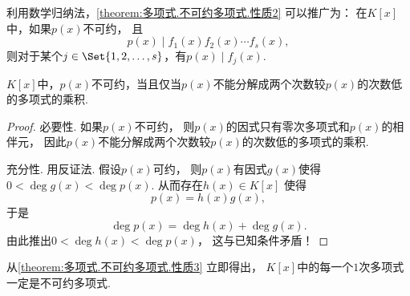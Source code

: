 利用数学归纳法，\cref{theorem:多项式.不可约多项式.性质2} 可以推广为：
在\(K[x]\)中，如果\(p(x)\)不可约，
且\begin{equation*}
	p(x) \mid f_1(x) f_2(x) \dotsm f_s(x),
\end{equation*}
则对于某个\(j \in \Set{1,2,\dotsc,s}\)，有\(p(x) \mid f_j(x)\).

\begin{property}\label{theorem:多项式.不可约多项式.性质3}
\(K[x]\)中，\(p(x)\)不可约，当且仅当\(p(x)\)不能分解成两个次数较\(p(x)\)的次数低的多项式的乘积.
\begin{proof}
必要性.
如果\(p(x)\)不可约，
则\(p(x)\)的因式只有零次多项式和\(p(x)\)的相伴元，
因此\(p(x)\)不能分解成两个次数较\(p(x)\)的次数低的多项式的乘积.

充分性.
用反证法.
假设\(p(x)\)可约，
则\(p(x)\)有因式\(g(x)\)使得\(0<\deg g(x)<\deg p(x)\).
从而存在\(h(x) \in K[x]\)
使得\begin{equation*}
	p(x) = h(x) g(x),
\end{equation*}
于是\begin{equation*}
	\deg p(x) = \deg h(x) + \deg g(x).
\end{equation*}
由此推出\(0<\deg h(x)<\deg p(x)\)，
这与已知条件矛盾！
\end{proof}
\end{property}

从\cref{theorem:多项式.不可约多项式.性质3} 立即得出，
\(K[x]\)中的每一个\(1\)次多项式一定是不可约多项式.

